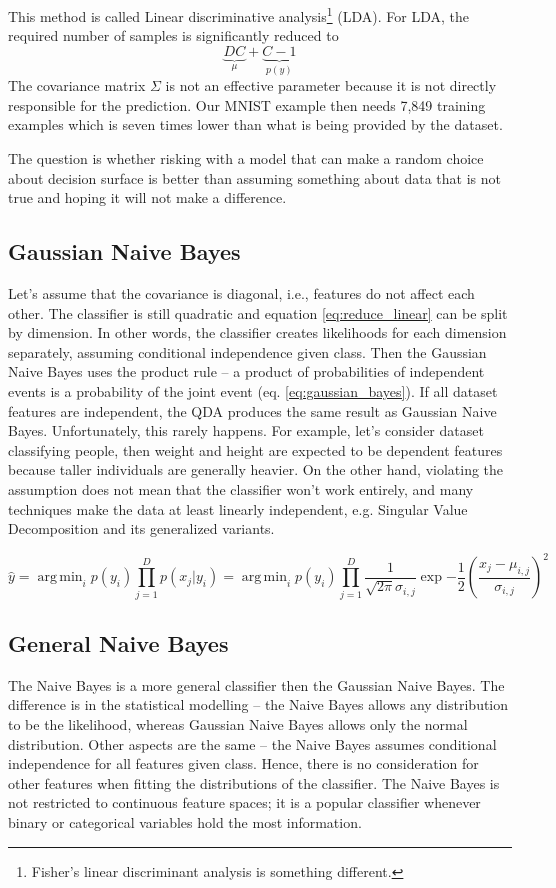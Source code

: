 \documentclass{article}
\DeclareMathOperator*{\argmin}{arg\,min}
\begin{document}
This method is called Linear discriminative analysis\footnote{Fisher's linear discriminant analysis is something different.} (LDA). 
For LDA, the required number of samples is significantly reduced to 
$$
    \underbrace{DC}_{\mu} + \underbrace{C - 1}_{p(y)}
$$
The covariance matrix $\Sigma$ is not an effective parameter because it is not directly responsible for the prediction.
Our MNIST example then needs 7,849 training examples which is seven times lower than what is being provided by the dataset.

The question is whether risking with a model that can make a random choice about decision surface is better 
than assuming something about data that is not true and hoping it will not make a difference.




\subsection{Gaussian Naive Bayes}
Let's assume that the covariance is diagonal, i.e., features do not affect each other. 
The classifier is still quadratic and equation \ref{eq:reduce_linear} can be split by dimension. 
In other words, the classifier creates likelihoods for each dimension separately, 
assuming conditional independence given class. 
Then the Gaussian Naive Bayes uses the product rule -- a product of probabilities of independent events is a probability of the joint event (eq. \ref{eq:gaussian_bayes}).
If all dataset features are independent, the QDA produces the same result as Gaussian Naive Bayes.
Unfortunately, this rarely happens. For example, let's consider dataset classifying people, 
then weight and height are expected to be dependent features because taller individuals are generally heavier. 
On the other hand, violating the assumption does not mean that the classifier won't work entirely, 
and many techniques make the data at least linearly independent, e.g. Singular Value Decomposition and its generalized variants.

\begin{equation}
    \hat{y} = \argmin_i p(y_i) \prod_{j=1}^D p(x_j | y_i) = 
    \argmin_i p(y_i) \prod_{j=1}^D 
        \frac{1}{\sqrt{2 \pi} \sigma_{i,j}} \exp{-\frac{1}{2} \left(\frac{x_j - \mu_{i,j}}{\sigma_{i,j}}\right)^2} 
    \label{eq:gaussian_bayes}
\end{equation}

\subsection{General Naive Bayes}
The Naive Bayes is a more general classifier then the Gaussian Naive Bayes.
The difference is in the statistical modelling -- the Naive Bayes allows any distribution to be the likelihood, whereas Gaussian Naive Bayes allows only the normal distribution.
Other aspects are the same -- the Naive Bayes assumes conditional independence for all features given class. 
Hence, there is no consideration for other features when fitting the distributions of the classifier.
The Naive Bayes is not restricted to continuous feature spaces; it is a popular classifier whenever binary or categorical variables hold the most information.
\end{document}
